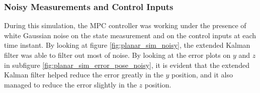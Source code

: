 \documentclass{thesisreport}
\begin{document}
\subsubsection*{Noisy Measurements and Control Inputs}

During this simulation, the MPC controller was working under the presence of white Gaussian noise on the state measurement and on the control inputs at each time instant. By looking at figure \ref{fig:planar_sim_noisy}, the extended Kalman filter was able to filter out most of noise. By looking at the error plots on $y$ and $z$ in subfigure \ref{fig:planar_sim_error_pose_noisy}, it is evident that the extended Kalman filter helped reduce the error greatly in the $y$ position, and it also managed to reduce the error slightly in the $z$ position.

\newpage
\end{document}
